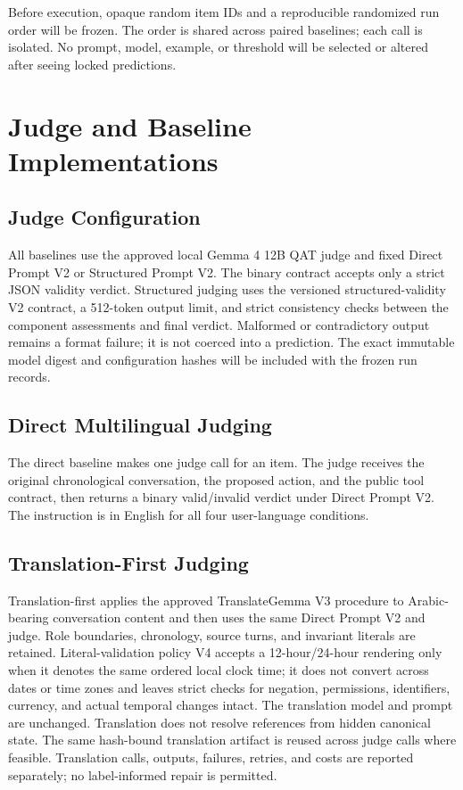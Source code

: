 \documentclass[11pt]{article}
\begin{document}
Before execution, opaque random item IDs and a reproducible randomized run order will be frozen. The order is shared across paired baselines; each call is isolated. No prompt, model, example, or threshold will be selected or altered after seeing locked predictions.

\section{Judge and Baseline Implementations}
\subsection{Judge Configuration}
All baselines use the approved local Gemma 4 12B QAT judge and fixed Direct Prompt V2 or Structured Prompt V2. The binary contract accepts only a strict JSON validity verdict. Structured judging uses the versioned structured-validity V2 contract, a 512-token output limit, and strict consistency checks between the component assessments and final verdict. Malformed or contradictory output remains a format failure; it is not coerced into a prediction. The exact immutable model digest and configuration hashes will be included with the frozen run records.

\subsection{Direct Multilingual Judging}
The direct baseline makes one judge call for an item. The judge receives the original chronological conversation, the proposed action, and the public tool contract, then returns a binary valid/invalid verdict under Direct Prompt V2. The instruction is in English for all four user-language conditions.

\subsection{Translation-First Judging}
Translation-first applies the approved TranslateGemma V3 procedure to Arabic-bearing conversation content and then uses the same Direct Prompt V2 and judge. Role boundaries, chronology, source turns, and invariant literals are retained. Literal-validation policy V4 accepts a 12-hour/24-hour rendering only when it denotes the same ordered local clock time; it does not convert across dates or time zones and leaves strict checks for negation, permissions, identifiers, currency, and actual temporal changes intact. The translation model and prompt are unchanged. Translation does not resolve references from hidden canonical state. The same hash-bound translation artifact is reused across judge calls where feasible. Translation calls, outputs, failures, retries, and costs are reported separately; no label-informed repair is permitted.
\end{document}
